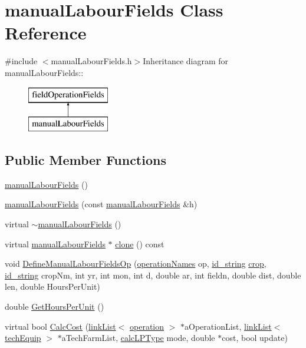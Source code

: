 \hypertarget{classmanual_labour_fields}{
\section{manualLabourFields Class Reference}
\label{classmanual_labour_fields}
}


{\ttfamily \#include $<$manualLabourFields.h$>$}Inheritance diagram for manualLabourFields::\begin{figure}[H]
\begin{center}
\leavevmode
\includegraphics[height=2cm]{classmanual_labour_fields}
\end{center}
\end{figure}
\subsection*{Public Member Functions}
\begin{DoxyCompactItemize}
\item 
\hyperlink{classmanual_labour_fields_aeabdab1cf334d123fe11a352c4f8bc33}{manualLabourFields} ()
\item 
\hyperlink{classmanual_labour_fields_abcd9a37e403784a25de34159eeeb023f}{manualLabourFields} (const \hyperlink{classmanual_labour_fields}{manualLabourFields} \&h)
\item 
virtual \hyperlink{classmanual_labour_fields_ad3312d15fd806538137091964d612c36}{$\sim$manualLabourFields} ()
\item 
virtual \hyperlink{classmanual_labour_fields}{manualLabourFields} $\ast$ \hyperlink{classmanual_labour_fields_acbf577ca188715bf0e4413f08e6d2861}{clone} () const 
\item 
void \hyperlink{classmanual_labour_fields_ad4e466fe839f838862782a76ac05f063}{DefineManualLabourFieldsOp} (\hyperlink{operation_names_8h_a77d40de6faa131199a5de6df3d9c7e3d}{operationNames} op, \hyperlink{classfield_operation_fields_a65517d20c09329343461131d07d48ecb}{id\_\-string} \hyperlink{classcrop}{crop}, \hyperlink{classfield_operation_fields_a65517d20c09329343461131d07d48ecb}{id\_\-string} cropNm, int yr, int mon, int d, double ar, int fieldn, double dist, double len, double HoursPerUnit)
\item 
double \hyperlink{classmanual_labour_fields_a136c2e2de43635528689f68b6bd8083f}{GetHoursPerUnit} ()
\item 
virtual bool \hyperlink{classmanual_labour_fields_a1baebed54c58272b5127e0fe713b1eea}{CalcCost} (\hyperlink{classlink_list}{linkList}$<$ \hyperlink{classoperation}{operation} $>$ $\ast$aOperationList, \hyperlink{classlink_list}{linkList}$<$ \hyperlink{classtech_equip}{techEquip} $>$ $\ast$aTechFarmList, \hyperlink{typer_8h_af05cf854fc14086a0d6404be5ae9813f}{calcLPType} mode, double $\ast$cost, bool update)
\end{DoxyCompactItemize}


